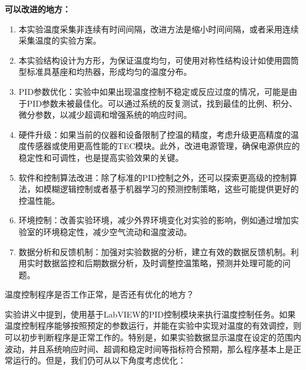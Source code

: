 \documentclass[dvipsnames, svgnames,a4paper,11pt]{article}
\begin{document}
	\textbf{可以改进的地方：}
	\begin{enumerate}
		\item 本实验温度采集非连续有时间间隔，改进方法是缩小时间间隔，或者采用连续采集温度的实验方案。
		
		\item 本实验结构设计为方形，为保证温度均匀，可使用对称性结构设计如使用圆筒型标准具基座和均热器，形成均匀的温度分布。
				
		\item PID参数优化：实验中如果出现温度控制不稳定或反应过度的情况，可能是由于PID参数未被最佳化。可以通过系统的反复测试，找到最佳的比例、积分、微分参数，以减少超调和增强系统的响应时间。
		
		\item 硬件升级：如果当前的仪器和设备限制了控温的精度，考虑升级更高精度的温度传感器或使用更高性能的TEC模块。此外，改进电源管理，确保电源供应的稳定性和可调性，也是提高实验效果的关键。
		
		\item 软件和控制算法改进：除了标准的PID控制之外，还可以探索更高级的控制算法，如模糊逻辑控制或者基于机器学习的预测控制策略，这些可能提供更好的控温性能。
		
		\item 环境控制：改善实验环境，减少外界环境变化对实验的影响，例如通过增加实验室的环境稳定性，减少空气流动和温度波动。
		
		\item 数据分析和反馈机制：加强对实验数据的分析，建立有效的数据反馈机制。利用实时数据监控和后期数据分析，及时调整控温策略，预测并处理可能的问题。
	\end{enumerate}
	
	
	\begin{question}
		温度控制程序是否工作正常，是否还有优化的地方？
	\end{question}
	实验讲义中提到，使用基于LabVIEW的PID控制模块来执行温度控制任务。如果温度控制程序能够按照预定的参数运行，并能在实验中实现对温度的有效调控，则可以初步判断程序是正常工作的。特别是，如果实验数据显示温度在设定的范围内波动，并且系统响应时间、超调和稳定时间等指标符合预期，那么程序基本上是正常运行的。但是，我们仍可从以下角度考虑优化：
	
\end{document}
